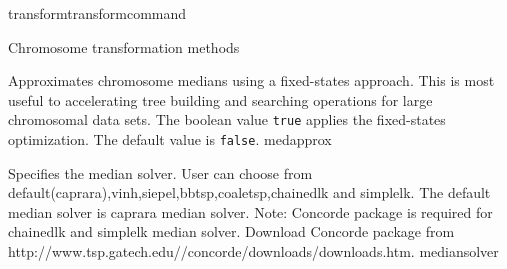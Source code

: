 \begin{command}{transform}{transformcommand}
\begin{arguments}
\begin{argumentgroup}{Chromosome transformation methods}
\begin{description}
                    {Approximates chromosome medians using a fixed-states
                    approach. This is most useful to accelerating tree
                    building and searching operations for large chromosomal
                    data sets. The boolean value \texttt{true} applies the
                    fixed-states optimization. The default value is
                    \texttt{false}.}
                    {medapprox}
                        
                   {Specifies the median solver. User can choose from
                   default(caprara),vinh,siepel,bbtsp,coaletsp,chainedlk and simplelk. The
                   default median solver is caprara median solver. Note:
                   Concorde package is required for chainedlk and simplelk
                   median solver. Download Concorde package from \\
                   http://www.tsp.gatech.edu//concorde/downloads/downloads.htm.  }
                   {mediansolver}
                       
                       


\end{description}
\end{argumentgroup}
\end{arguments}
\end{command}
